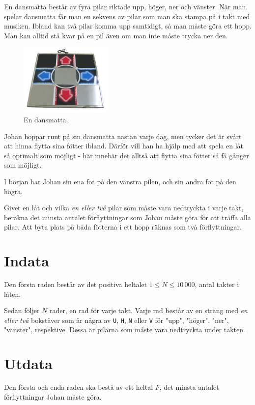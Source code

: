 En dansmatta består av fyra pilar riktade upp, höger, ner och vänster. När man spelar dansmatta får man en sekvens av pilar som man ska stampa på i takt med musiken. Ibland kan två pilar komma upp samtidigt, så man måste göra ett hopp. Man kan alltid stå kvar på en pil även om man inte måste trycka ner den.

\begin{figure}[ht!]
\centering
\includegraphics[width=0.4\textwidth]{dansmatta.png}
\caption{En dansmatta.}
\end{figure}

Johan hoppar runt på sin dansmatta nästan varje dag, men tycker det är svårt att hinna flytta sina fötter ibland. Därför vill han ha hjälp med att spela en låt så optimalt som möjligt - här innebär det alltså att flytta sina fötter så få gånger som möjligt.

I början har Johan sin ena fot på den vänstra pilen, och sin andra fot på den högra.

Givet en låt och vilka \emph{en eller två} pilar som måste vara nedtryckta i varje takt, beräkna det minsta antalet förflyttningar som Johan måste göra för att träffa alla pilar. Att byta plats på båda fötterna i ett hopp räknas som två förflyttningar.


\section*{Indata}
Den första raden består av det positiva heltalet $1 \le N \le 10\,000$, antal takter i låten.

Sedan följer $N$ rader, en rad för varje takt. Varje rad består av en sträng med \emph{en eller två} bokstäver som är några av \texttt{U}, \texttt{H}, \texttt{N} eller \texttt{V} för "upp", "höger", "ner", "vänster", respektive. Dessa är pilarna som måste vara nedtryckta under takten.

\section*{Utdata}
Den första och enda raden ska bestå av ett heltal $F$, det minsta antalet förflyttningar Johan måste göra.

